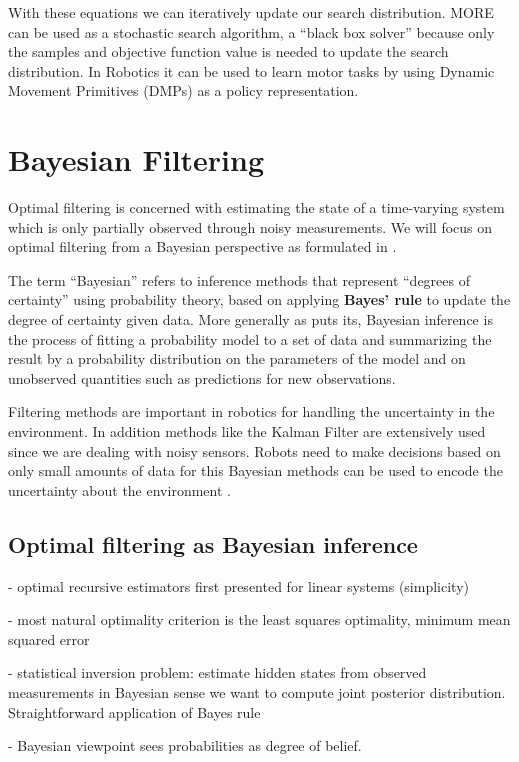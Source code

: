 With these equations we can iteratively update our search distribution.
MORE can be used as a stochastic search algorithm,
a ``black box solver'' because only the samples and objective function value
is needed to update the search distribution.
In Robotics it can be used to learn motor tasks
by using Dynamic Movement Primitives
(DMPs) as a policy representation.

\section{Bayesian Filtering}
Optimal filtering is concerned with estimating the state
of a time-varying system
which is only partially observed through noisy measurements.
We will focus on optimal filtering from a Bayesian perspective
as formulated in \citet{sarkka2013bayesian}.

The term ``Bayesian'' refers to inference methods that represent
``degrees of certainty'' using probability theory, based on applying
\textbf{Bayes' rule} to update the degree of certainty given data.
More generally as \citet{gelman2013bayesian} puts its, Bayesian inference
is the process of fitting a probability model
to a set of data and summarizing the result by a probability distribution
on the parameters of the model and on unobserved quantities such
as predictions for new observations.

Filtering methods are important in robotics
for handling the uncertainty in the
environment.
In addition methods like the Kalman Filter are extensively used
since we are dealing with noisy sensors.
Robots need to make decisions based on only small amounts
of data for this Bayesian methods can be used to encode the
uncertainty about the environment \citet{thrun2002probabilistic}.

\subsection{Optimal filtering as Bayesian inference}
- optimal recursive estimators first presented for linear systems (simplicity)

- most natural optimality criterion is the least squares optimality,
minimum mean squared error

- statistical inversion problem: estimate hidden states from observed
measurements in Bayesian sense we want to compute joint posterior distribution.
Straightforward application of Bayes rule

- Bayesian viewpoint sees probabilities as degree of belief.

